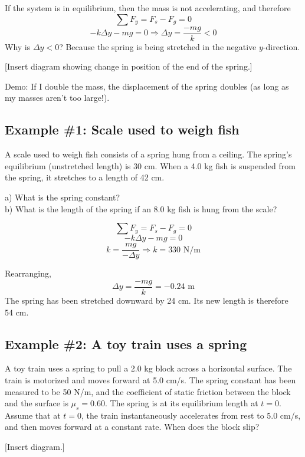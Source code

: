 If the system is in equilibrium, then the mass is not accelerating, and therefore
$$\sum F_y = F_s-F_g=0$$
$$-k\Delta{y}-mg=0\Rightarrow \Delta{y}=\frac{-mg}{k}<0$$
Why is $\Delta{y}<0$? Because the spring is being stretched in the negative $y$-direction.

[Insert diagram showing change in position of the end of the spring.]
\vspace{5cm}

Demo: If I double the mass, the displacement of the spring doubles (as long as my masses aren't too large!).

\subsection{Example \#1: Scale used to weigh fish}
A scale used to weigh fish consists of a spring hung from a ceiling. The spring's equilibrium (unstretched length) is 30 cm. When a 4.0 kg fish is suspended from the spring, it stretches to a length of 42 cm.

a) What is the spring constant?\\
b) What is the length of the spring if an 8.0 kg fish is hung from the scale?


$$\sum F_y=F_s-F_g=0$$
$$-k\Delta{y}-mg=0$$
$$k=\frac{mg}{-\Delta{y}}\Rightarrow \boxed{k=330\mbox{ N/m}}$$

Rearranging,
$$\Delta{y}=\frac{-mg}{k}=-0.24\mbox{ m}$$
The spring has been stretched downward by 24 cm. Its new length is therefore $\boxed{54\mbox{ cm}}$.

\subsection{Example \#2: A toy train uses a spring}
A toy train uses a spring to pull a 2.0 kg block across a horizontal surface. The train is motorized and moves forward at 5.0 cm/s. The spring constant has been measured to be 50 N/m, and the coefficient of static friction between the block and the surface is $\mu_s=0.60$. The spring is at its equilibrium length at $t=0$. Assume that at $t=0$, the train instantaneously accelerates from rest to 5.0 cm/s, and then moves forward at a constant rate. When does the block slip?

[Insert diagram.]
\vspace{5cm}


